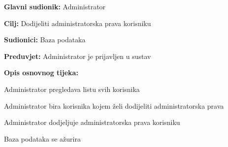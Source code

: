 				
				\noindent {}
				\begin{packed_item}
					
					\item \textbf{Glavni sudionik:} Administrator
					\item  \textbf{Cilj:} Dodijeliti administratorska prava korisniku
					\item  \textbf{Sudionici:} Baza podataka
					\item  \textbf{Preduvjet:} Administrator je prijavljen u sustav
					\item  \textbf{Opis osnovnog tijeka:}
					
					\item[] \begin{packed_enum}
						
						\item Administrator pregledava listu svih korisnika					
						\item Administrator bira korisnika kojem želi dodijeliti administratorska prava
						\item Administrator dodjeljuje administratorska prava korisniku
						\item Baza podataka se ažurira
					\end{packed_enum}
					
				\end{packed_item}
				

